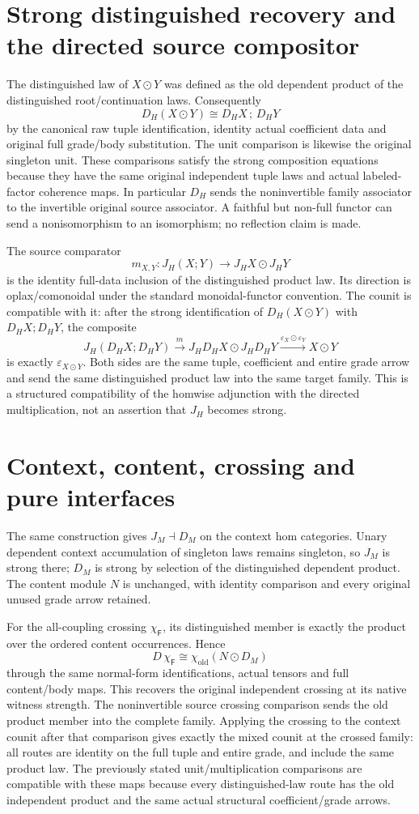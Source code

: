 \documentclass[11pt]{article}
\begin{document}
\section{Strong distinguished recovery and the directed source compositor}
The distinguished law of $X\odot Y$ was defined as the old dependent product of the distinguished root/continuation laws. Consequently
\[
 D_H(X\odot Y)\cong D_HX\,;\,D_HY
\]
by the canonical raw tuple identification, identity actual coefficient data and original full grade/body substitution. The unit comparison is likewise the original singleton unit. These comparisons satisfy the strong composition equations because they have the same original independent tuple laws and actual labeled-factor coherence maps. In particular $D_H$ sends the noninvertible family associator to the invertible original source associator. A faithful but non-full functor can send a nonisomorphism to an isomorphism; no reflection claim is made.

The source comparator
\[
 m_{X,Y}:J_H(X;Y)\longrightarrow J_HX\odot J_HY
\]
is the identity full-data inclusion of the distinguished product law. Its direction is oplax/comonoidal under the standard monoidal-functor convention. The counit is compatible with it: after the strong identification of $D_H(X\odot Y)$ with $D_HX;D_HY$, the composite
\[
 J_H(D_HX;D_HY)\xrightarrow{m}
 J_HD_HX\odot J_HD_HY\xrightarrow{\varepsilon_X\odot\varepsilon_Y}
 X\odot Y
\]
is exactly $\varepsilon_{X\odot Y}$. Both sides are the same tuple, coefficient and entire grade arrow and send the same distinguished product law into the same target family. This is a structured compatibility of the homwise adjunction with the directed multiplication, not an assertion that $J_H$ becomes strong.

\section{Context, content, crossing and pure interfaces}
The same construction gives $J_M\dashv D_M$ on the context hom categories. Unary dependent context accumulation of singleton laws remains singleton, so $J_M$ is strong there; $D_M$ is strong by selection of the distinguished dependent product. The content module $N$ is unchanged, with identity comparison and every original unused grade arrow retained.

For the all-coupling crossing $\chi_{\mathsf F}$, its distinguished member is exactly the product over the ordered content occurrences. Hence
\[
 D\,\chi_{\mathsf F}\cong\chi_{\mathrm{old}}(N\odot D_M)
\]
through the same normal-form identifications, actual tensors and full content/body maps. This recovers the original independent crossing at its native witness strength. The noninvertible source crossing comparison sends the old product member into the complete family. Applying the crossing to the context counit after that comparison gives exactly the mixed counit at the crossed family: all routes are identity on the full tuple and entire grade, and include the same product law. The previously stated unit/multiplication comparisons are compatible with these maps because every distinguished-law route has the old independent product and the same actual structural coefficient/grade arrows.
\end{document}
